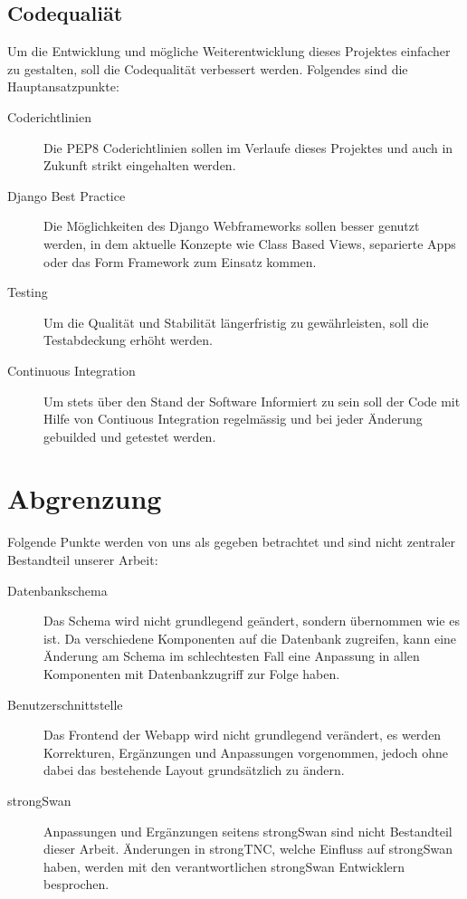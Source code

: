 \subsection{Codequaliät}
Um die Entwicklung und mögliche Weiterentwicklung dieses Projektes einfacher zu gestalten, soll die Codequalität verbessert werden. Folgendes sind die Hauptansatzpunkte:
\begin{description}
	\item[Coderichtlinien] Die PEP8 Coderichtlinien sollen im Verlaufe dieses
	Projektes und auch in Zukunft strikt eingehalten werden.
	
	\item[Django Best Practice] Die Möglichkeiten des Django Webframeworks sollen
	besser genutzt werden, in dem aktuelle Konzepte wie Class Based Views,
	separierte Apps oder das Form Framework zum Einsatz kommen.
	
	\item[Testing] Um die Qualität und Stabilität längerfristig zu gewährleisten,
	soll die Testabdeckung erhöht werden.
	
	\item[Continuous Integration] Um stets über den Stand der Software Informiert
	zu sein soll der Code mit Hilfe von Contiuous Integration regelmässig und bei
	jeder Änderung gebuilded und getestet werden.
	
\end{description}


\section{Abgrenzung}
Folgende Punkte werden von uns als gegeben betrachtet und sind nicht zentraler
Bestandteil unserer Arbeit:

\begin{description}
	\item[Datenbankschema] Das Schema wird nicht grundlegend geändert, sondern
	übernommen wie es ist. Da verschiedene Komponenten auf die Datenbank zugreifen,
	kann eine Änderung am Schema im schlechtesten Fall eine Anpassung in allen
	Komponenten mit Datenbankzugriff zur Folge haben.

	\item[Benutzerschnittstelle] Das Frontend der Webapp wird nicht grundlegend
	verändert, es werden Korrekturen, Ergänzungen und Anpassungen vorgenommen,
	jedoch ohne dabei das bestehende Layout grundsätzlich zu ändern.

	\item[strongSwan] Anpassungen und Ergänzungen seitens strongSwan sind nicht
	Bestandteil dieser Arbeit. Änderungen in strongTNC, welche Einfluss auf
	strongSwan haben, werden mit den verantwortlichen strongSwan Entwicklern
	besprochen.
\end{description}

